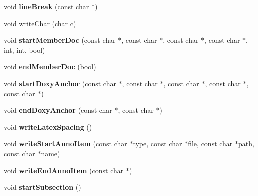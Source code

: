 \begin{DoxyCompactItemize}
\item 
\mbox{\label{class_man_generator_a3c7ce366b7915a1c3dc6129182f0f9e8}} 
void {\bfseries line\+Break} (const char $\ast$)
\item 
void \mbox{\hyperlink{class_man_generator_a5831577a90e226daf7ad892dd8744d33}{write\+Char}} (char c)
\item 
\mbox{\label{class_man_generator_a84edf6edf092cdef65a7f55df41c6aac}} 
void {\bfseries start\+Member\+Doc} (const char $\ast$, const char $\ast$, const char $\ast$, const char $\ast$, int, int, bool)
\item 
\mbox{\label{class_man_generator_aa4f870d246564655e89f9d50647e5df0}} 
void {\bfseries end\+Member\+Doc} (bool)
\item 
\mbox{\label{class_man_generator_a76c670385ec8cf1dccf4f4f16494e79b}} 
void {\bfseries start\+Doxy\+Anchor} (const char $\ast$, const char $\ast$, const char $\ast$, const char $\ast$, const char $\ast$)
\item 
\mbox{\label{class_man_generator_a47b84c3d099ed32ac6ad1875c84ccd24}} 
void {\bfseries end\+Doxy\+Anchor} (const char $\ast$, const char $\ast$)
\item 
\mbox{\label{class_man_generator_adc7746d2f225bc7742dc0fd23fd9bf1e}} 
void {\bfseries write\+Latex\+Spacing} ()
\item 
\mbox{\label{class_man_generator_a8a403fb64475a8a08a959176fdd754f0}} 
void {\bfseries write\+Start\+Anno\+Item} (const char $\ast$type, const char $\ast$file, const char $\ast$path, const char $\ast$name)
\item 
\mbox{\label{class_man_generator_afda450fa7e610bf25690ca6211a3bf8e}} 
void {\bfseries write\+End\+Anno\+Item} (const char $\ast$)
\item 
\mbox{\label{class_man_generator_a8b76bb902110b0df8f020b73207baf0c}} 
void {\bfseries start\+Subsection} ()
\item 
\mbox{\label{class_man_generator_a4ae427e8787652bcc456f58f729079a3}} 

\end{DoxyCompactItemize}
